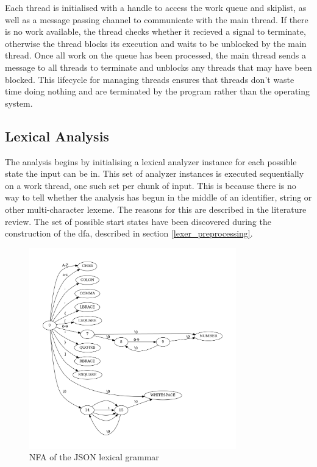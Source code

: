 Each thread is initialised with a handle to access the work queue and skiplist, as well as a message
passing channel to communicate with the main thread. If there is no work available, the thread
checks whether it recieved a signal to terminate, otherwise the thread blocks its execution and
waits to be unblocked by the main thread. Once all work on the queue has been processed, the main
thread sends a message to all threads to terminate and unblocks any threads that may have been
blocked. This lifecycle for managing threads ensures that threads don't waste time doing nothing and
are terminated by the program rather than the operating system.

\subsection{Lexical Analysis}

The analysis begins by initialising a lexical analyzer instance for each possible state the input can be in. This set of analyzer instances is executed sequentially on a work thread, one such set per chunk of input. This is because there is no way to tell whether the analysis has begun in the middle of an identifier, string or other multi-character lexeme. The reasons for this are described in the literature review. The set of possible start states have been discovered during the construction of the \gls{dfa}, described in section \ref{lexer_preprocessing}.

\begin{figure}[t]
\includegraphics[width=0.8\textwidth]{images/nfa.png}
\caption{NFA of the JSON lexical grammar}
\label{fig:nfa}
\end{figure}

